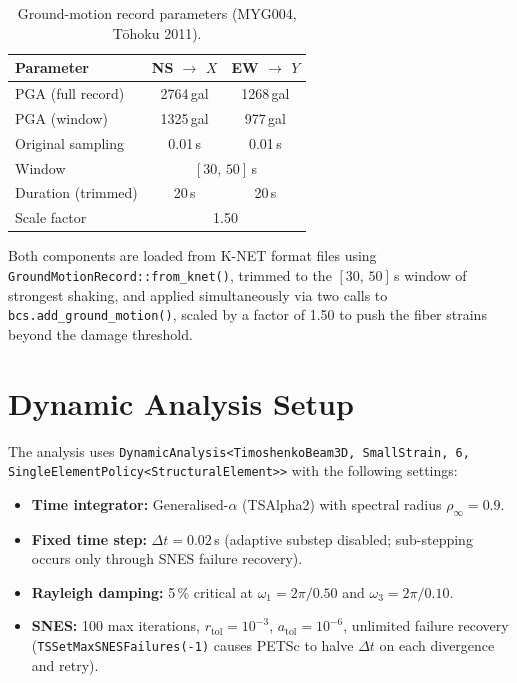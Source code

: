 \begin{table}[htbp]
  \centering
  \caption{Ground-motion record parameters (MYG004, T\={o}hoku 2011).}
  \label{tab:lshaped-eq}
  \begin{tabular}{lcc}
    \toprule
    Parameter          & NS $\to$ $X$ & EW $\to$ $Y$ \\
    \midrule
    PGA (full record)  & 2764\,gal & 1268\,gal \\
    PGA (window)       & 1325\,gal &  977\,gal \\
    Original sampling  & 0.01\,s   & 0.01\,s   \\
    Window             & \multicolumn{2}{c}{$[30,\,50]$\,s} \\
    Duration (trimmed) & 20\,s     & 20\,s     \\
    Scale factor       & \multicolumn{2}{c}{1.50} \\
    \bottomrule
  \end{tabular}
\end{table}

Both components are loaded from K-NET format files using
\texttt{GroundMotionRecord::from\_knet()}, trimmed to the
$[30,\,50]$\,s window of strongest shaking, and applied simultaneously
via two calls to \texttt{bcs.add\_ground\_motion()}, scaled by a factor
of 1.50 to push the fiber strains beyond the damage threshold.


\section{Dynamic Analysis Setup}
\label{sec:lshaped-solver}

The analysis uses \texttt{DynamicAnalysis<TimoshenkoBeam3D, SmallStrain, 6,
SingleElementPolicy<StructuralElement>>} with the following settings:

\begin{itemize}
  \item \textbf{Time integrator:} Generalised-$\alpha$ (TSAlpha2) with
        spectral radius $\rho_\infty = 0.9$.
  \item \textbf{Fixed time step:} $\Delta t = 0.02$\,s (adaptive substep
        disabled; sub-stepping occurs only through SNES failure recovery).
  \item \textbf{Rayleigh damping:} 5\,\% critical at $\omega_1 = 2\pi/0.50$
        and $\omega_3 = 2\pi/0.10$.
  \item \textbf{SNES:} 100 max iterations, $r_{\text{tol}} = 10^{-3}$,
        $a_{\text{tol}} = 10^{-6}$, unlimited failure recovery
        (\texttt{TSSetMaxSNESFailures(-1)} causes PETSc to halve $\Delta t$
        on each divergence and retry).
\end{itemize}

